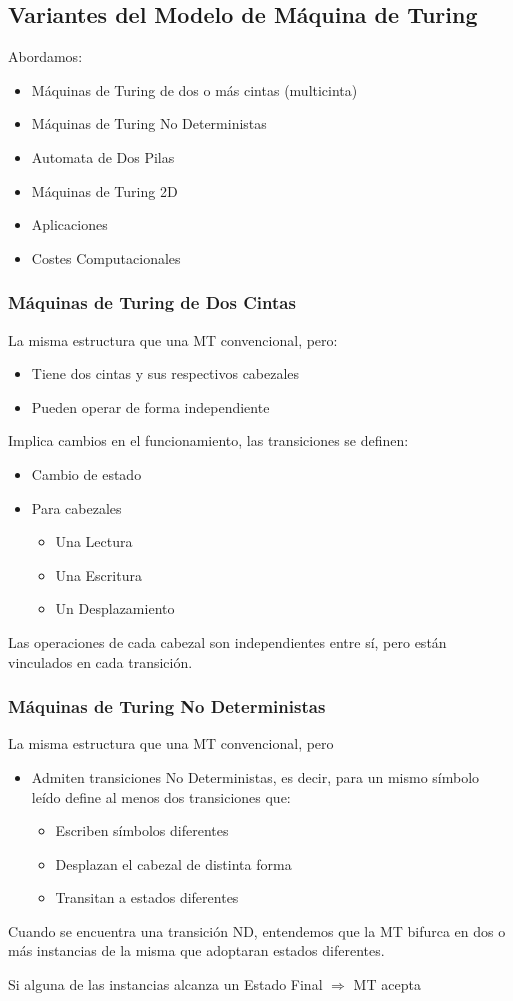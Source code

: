\subsection{Variantes del Modelo de Máquina de Turing}
Abordamos:
\begin{itemize}
    \item Máquinas de Turing de dos o más cintas (multicinta)
    \item Máquinas de Turing No Deterministas
    \item Automata de Dos Pilas
    \item Máquinas de Turing 2D
    \item Aplicaciones
    \item Costes Computacionales
\end{itemize}

\subsubsection{Máquinas de Turing de Dos Cintas}
La misma estructura que una MT convencional, pero:
\begin{itemize}
    \item Tiene dos cintas y sus respectivos cabezales
    \item Pueden operar de forma independiente
\end{itemize}

Implica cambios en el funcionamiento, las transiciones se definen:
\begin{itemize}
    \item Cambio de estado
    \item Para cabezales
    \begin{itemize}
        \item Una Lectura
        \item Una Escritura
        \item Un Desplazamiento
    \end{itemize}
\end{itemize}

Las operaciones de cada cabezal son independientes entre sí, pero están vinculados en cada transición.

\subsubsection{Máquinas de Turing No Deterministas}
La misma estructura que una MT convencional, pero
\begin{itemize}
    \item Admiten transiciones No Deterministas, es decir, para un mismo símbolo leído define al menos dos transiciones que:
    \begin{itemize}
        \item Escriben símbolos diferentes
        \item Desplazan el cabezal de distinta forma
        \item Transitan a estados diferentes
    \end{itemize}
\end{itemize}

Cuando se encuentra una transición ND, entendemos que la MT bifurca en dos o más instancias de la misma que adoptaran estados diferentes.

Si alguna de las instancias alcanza un Estado Final $\Rightarrow$ MT acepta